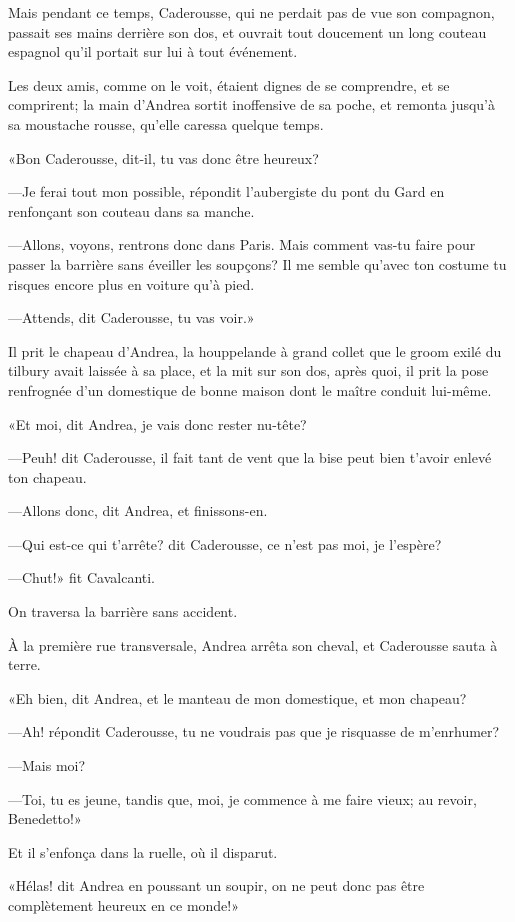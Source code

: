 Mais pendant ce temps, Caderousse, qui ne perdait pas de vue son compagnon, passait ses mains derrière son dos, et ouvrait tout doucement un long couteau espagnol qu'il portait sur lui à tout événement. 

Les deux amis, comme on le voit, étaient dignes de se comprendre, et se comprirent; la main d'Andrea sortit inoffensive de sa poche, et remonta jusqu'à sa moustache rousse, qu'elle caressa quelque temps. 

«Bon Caderousse, dit-il, tu vas donc être heureux? 

—Je ferai tout mon possible, répondit l'aubergiste du pont du Gard en renfonçant son couteau dans sa manche. 

—Allons, voyons, rentrons donc dans Paris. Mais comment vas-tu faire pour passer la barrière sans éveiller les soupçons? Il me semble qu'avec ton costume tu risques encore plus en voiture qu'à pied. 

—Attends, dit Caderousse, tu vas voir.» 

Il prit le chapeau d'Andrea, la houppelande à grand collet que le groom exilé du tilbury avait laissée à sa place, et la mit sur son dos, après quoi, il prit la pose renfrognée d'un domestique de bonne maison dont le maître conduit lui-même. 

«Et moi, dit Andrea, je vais donc rester nu-tête? 

—Peuh! dit Caderousse, il fait tant de vent que la bise peut bien t'avoir enlevé ton chapeau. 

—Allons donc, dit Andrea, et finissons-en. 

—Qui est-ce qui t'arrête? dit Caderousse, ce n'est pas moi, je l'espère? 

—Chut!» fit Cavalcanti. 

On traversa la barrière sans accident. 

À la première rue transversale, Andrea arrêta son cheval, et Caderousse sauta à terre. 

«Eh bien, dit Andrea, et le manteau de mon domestique, et mon chapeau? 

—Ah! répondit Caderousse, tu ne voudrais pas que je risquasse de m'enrhumer? 

—Mais moi? 

—Toi, tu es jeune, tandis que, moi, je commence à me faire vieux; au revoir, Benedetto!» 

Et il s'enfonça dans la ruelle, où il disparut. 

«Hélas! dit Andrea en poussant un soupir, on ne peut donc pas être complètement heureux en ce monde!» 